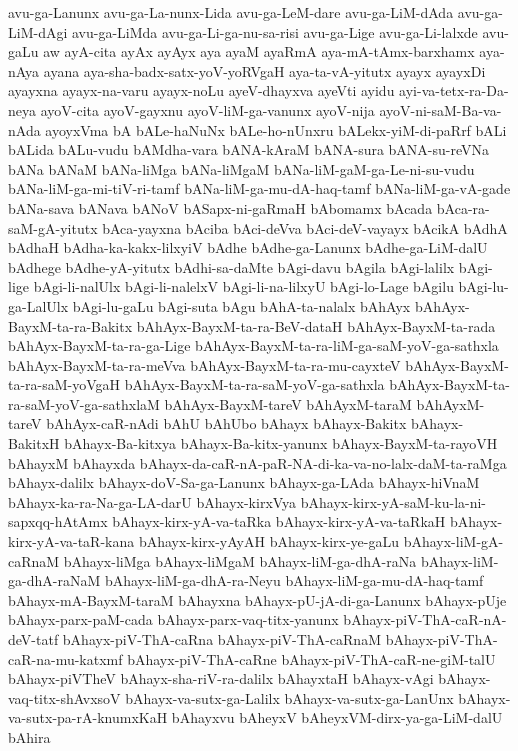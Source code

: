 {avu-ga-Lanunx
avu-ga-La-nunx-Lida
avu-ga-LeM-dare
avu-ga-LiM-dAda
avu-ga-LiM-dAgi
avu-ga-LiMda
avu-ga-Li-ga-nu-sa-risi
avu-ga-Lige
avu-ga-Li-lalxde
avu-gaLu
aw
ayA-cita
ayAx
ayAyx
aya
ayaM
ayaRmA
aya-mA-tAmx-barxhamx
aya-nAya
ayana
aya-sha-badx-satx-yoV-yoRVgaH
aya-ta-vA-yitutx
ayayx
ayayxDi
ayayxna
ayayx-na-varu
ayayx-noLu
ayeV-dhayxva
ayeVti
ayidu
ayi-va-tetx-ra-Da-neya
ayoV-cita
ayoV-gayxnu
ayoV-liM-ga-vanunx
ayoV-nija
ayoV-ni-saM-Ba-va-nAda
ayoyxVma
bA
bALe-haNuNx
bALe-ho-nUnxru
bALekx-yiM-di-paRrf
bALi
bALida
bALu-vudu
bAMdha-vara
bANA-kAraM
bANA-sura
bANA-su-reVNa
bANa
bANaM
bANa-liMga
bANa-liMgaM
bANa-liM-gaM-ga-Le-ni-su-vudu
bANa-liM-ga-mi-tiV-ri-tamf
bANa-liM-ga-mu-dA-haq-tamf
bANa-liM-ga-vA-gade
bANa-sava
bANava
bANoV
bASapx-ni-gaRmaH
bAbomamx
bAcada
bAca-ra-saM-gA-yitutx
bAca-yayxna
bAciba
bAci-deVva
bAci-deV-vayayx
bAcikA
bAdhA
bAdhaH
bAdha-ka-kakx-lilxyiV
bAdhe
bAdhe-ga-Lanunx
bAdhe-ga-LiM-dalU
bAdhege
bAdhe-yA-yitutx
bAdhi-sa-daMte
bAgi-davu
bAgila
bAgi-lalilx
bAgi-lige
bAgi-li-nalUlx
bAgi-li-nalelxV
bAgi-li-na-lilxyU
bAgi-lo-Lage
bAgilu
bAgi-lu-ga-LalUlx
bAgi-lu-gaLu
bAgi-suta
bAgu
bAhA-ta-nalalx
bAhAyx
bAhAyx-BayxM-ta-ra-Bakitx
bAhAyx-BayxM-ta-ra-BeV-dataH
bAhAyx-BayxM-ta-rada
bAhAyx-BayxM-ta-ra-ga-Lige
bAhAyx-BayxM-ta-ra-liM-ga-saM-yoV-ga-sathxla
bAhAyx-BayxM-ta-ra-meVva
bAhAyx-BayxM-ta-ra-mu-cayxteV
bAhAyx-BayxM-ta-ra-saM-yoVgaH
bAhAyx-BayxM-ta-ra-saM-yoV-ga-sathxla
bAhAyx-BayxM-ta-ra-saM-yoV-ga-sathxlaM
bAhAyx-BayxM-tareV
bAhAyxM-taraM
bAhAyxM-tareV
bAhAyx-caR-nAdi
bAhU
bAhUbo
bAhayx
bAhayx-Bakitx
bAhayx-BakitxH
bAhayx-Ba-kitxya
bAhayx-Ba-kitx-yanunx
bAhayx-BayxM-ta-rayoVH
bAhayxM
bAhayxda
bAhayx-da-caR-nA-paR-NA-di-ka-va-no-lalx-daM-ta-raMga
bAhayx-dalilx
bAhayx-doV-Sa-ga-Lanunx
bAhayx-ga-LAda
bAhayx-hiVnaM
bAhayx-ka-ra-Na-ga-LA-darU
bAhayx-kirxVya
bAhayx-kirx-yA-saM-ku-la-ni-sapxqq-hAtAmx
bAhayx-kirx-yA-va-taRka
bAhayx-kirx-yA-va-taRkaH
bAhayx-kirx-yA-va-taR-kana
bAhayx-kirx-yAyAH
bAhayx-kirx-ye-gaLu
bAhayx-liM-gA-caRnaM
bAhayx-liMga
bAhayx-liMgaM
bAhayx-liM-ga-dhA-raNa
bAhayx-liM-ga-dhA-raNaM
bAhayx-liM-ga-dhA-ra-Neyu
bAhayx-liM-ga-mu-dA-haq-tamf
bAhayx-mA-BayxM-taraM
bAhayxna
bAhayx-pU-jA-di-ga-Lanunx
bAhayx-pUje
bAhayx-parx-paM-cada
bAhayx-parx-vaq-titx-yanunx
bAhayx-piV-ThA-caR-nA-deV-tatf
bAhayx-piV-ThA-caRna
bAhayx-piV-ThA-caRnaM
bAhayx-piV-ThA-caR-na-mu-katxmf
bAhayx-piV-ThA-caRne
bAhayx-piV-ThA-caR-ne-giM-talU
bAhayx-piVTheV
bAhayx-sha-riV-ra-dalilx
bAhayxtaH
bAhayx-vAgi
bAhayx-vaq-titx-shAvxsoV
bAhayx-va-sutx-ga-Lalilx
bAhayx-va-sutx-ga-LanUnx
bAhayx-va-sutx-pa-rA-knumxKaH
bAhayxvu
bAheyxV
bAheyxVM-dirx-ya-ga-LiM-dalU
bAhira
}
